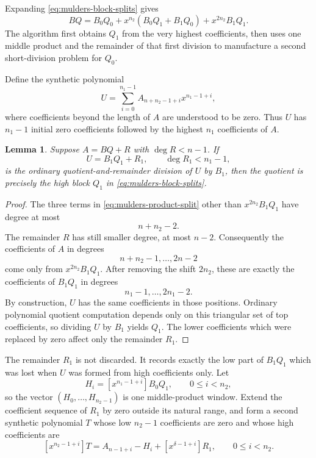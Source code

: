 \documentclass[11pt]{book}
\newtheorem{lemma}[theorem]{Lemma}
\theoremstyle{definition}
\begin{document}
Expanding \eqref{eq:mulders-block-splits} gives
\begin{equation}\label{eq:mulders-product-split}
 BQ
 =B_0Q_0
 +x^{n_2}(B_0Q_1+B_1Q_0)
 +x^{2n_2}B_1Q_1.
\end{equation}
The algorithm first obtains $Q_1$ from the very highest coefficients, then uses
one middle product and the remainder of that first division to manufacture a
second short-division problem for $Q_0$.

Define the synthetic polynomial
\begin{equation}\label{eq:mulders-U}
 U=
 \sum_{i=0}^{n_1-1} A_{n+n_2-1+i}x^{n_1-1+i},
\end{equation}
where coefficients beyond the length of $A$ are understood to be zero.  Thus
$U$ has $n_1-1$ initial zero coefficients followed by the highest $n_1$
coefficients of $A$.

\begin{lemma}\label{lem:mulders-high-block}
Suppose $A=BQ+R$ with $\deg R<n-1$.  If
\[
 U=B_1Q_1+R_1,
 \qquad \deg R_1<n_1-1,
\]
is the ordinary quotient-and-remainder division of $U$ by $B_1$, then the
quotient is precisely the high block $Q_1$ in
\eqref{eq:mulders-block-splits}.
\end{lemma}

\begin{proof}
The three terms in \eqref{eq:mulders-product-split} other than
$x^{2n_2}B_1Q_1$ have degree at most
\[
 n+n_2-2.
\]
The remainder $R$ has still smaller degree, at most $n-2$.  Consequently the
coefficients of $A$ in degrees
\[
 n+n_2-1,\ldots,2n-2
\]
come only from $x^{2n_2}B_1Q_1$.  After removing the shift $2n_2$, these are
exactly the coefficients of $B_1Q_1$ in degrees
\[
 n_1-1,\ldots,2n_1-2.
\]
By construction, $U$ has the same coefficients in those positions.  Ordinary
polynomial quotient computation depends only on this triangular set of top
coefficients, so dividing $U$ by $B_1$ yields $Q_1$.  The lower coefficients
which were replaced by zero affect only the remainder $R_1$.
\end{proof}

The remainder $R_1$ is not discarded.  It records exactly the low part of
$B_1Q_1$ which was lost when $U$ was formed from high coefficients only.  Let
\[
 H_i=[x^{n_1-1+i}]B_0Q_1,
 \qquad 0\leq i<n_2,
\]
so the vector $(H_0,\ldots,H_{n_2-1})$ is one middle-product window.  Extend
the coefficient sequence of $R_1$ by zero outside its natural range, and form
a second synthetic polynomial $T$ whose low $n_2-1$ coefficients are zero and
whose high coefficients are
\begin{equation}\label{eq:mulders-T-def}
 [x^{n_2-1+i}]T
 =A_{n-1+i}-H_i+[x^{\delta-1+i}]R_1,
 \qquad 0\leq i<n_2.
\end{equation}
\end{document}
